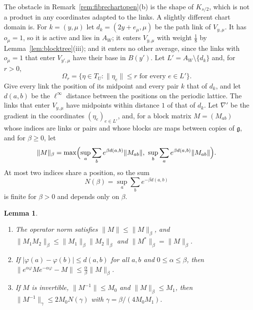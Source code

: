 \documentclass[11pt]{amsart}
\newtheorem{lemma}[theorem]{Lemma}
\theoremstyle{definition}
\theoremstyle{remark}
\numberwithin{equation}{section}
\newcommand{\g}{\mathfrak{g}}
\begin{document}
The obstacle in Remark~\ref{rem:fibrechartopen}(b) is the shape of
$K_{s/2}$, which is not a product in any coordinates adapted to the links. A
slightly different chart domain is. For $k=(y,\mu)$ let $d_k=(2y+e_\mu,\mu)$
be the path link of $V_{y,\mu}$. It has $o_\mu=1$, so it is active and lies
in $A_W$; it enters $V_{y,\mu}$ with weight $\frac18$ by
Lemma~\ref{lem:blocktree}(iii); and it enters no other average, since the
links with $o_\mu=1$ that enter $V_{y',\mu}$ have their base in $B(y')$. Let
$L'=A_W\setminus\{d_k\}$ and, for $r>0$,
\[
\Omega_r=\{\eta\in T_U:\lVert\eta_e\rVert\le r\text{ for every }e\in L'\}.
\]
Give every link the position of its midpoint and every pair $k$ that of
$d_k$, and let $d(a,b)$ be the $\ell^\infty$ distance between the positions
on the periodic lattice. The links that enter $V_{y,\mu}$ have midpoints
within distance $1$ of that of $d_k$. Let $\nabla'$ be the gradient in the
coordinates $(\eta_e)_{e\in L'}$, and, for a block matrix $M=(M_{ab})$
whose indices are links or pairs and whose blocks are maps between copies
of $\g$, and for $\beta\ge0$, let
\[
\lVert M\rVert_\beta=\max\Bigl(\sup_a\sum_be^{\beta d(a,b)}\lVert M_{ab}
\rVert,\ \sup_b\sum_ae^{\beta d(a,b)}\lVert M_{ab}\rVert\Bigr).
\]
At most two indices share a position, so the sum
\[
N(\beta)=\sup_a\sum_be^{-\beta d(a,b)}
\]
is finite for $\beta>0$ and depends only on $\beta$.

\begin{lemma}\label{lem:kernels}
\begin{enumerate}[label=\textup{(\roman*)},leftmargin=*]
\item The operator norm satisfies $\lVert M\rVert\le\lVert M\rVert_\beta$,
and $\lVert M_1M_2\rVert_\beta\le\lVert M_1\rVert_\beta\lVert M_2
\rVert_\beta$ and $\lVert M^*\rVert_\beta=\lVert M\rVert_\beta$.
\item If $|\varphi(a)-\varphi(b)|\le d(a,b)$ for all $a,b$ and $0\le\alpha
\le\beta$, then $\lVert e^{\alpha\varphi}Me^{-\alpha\varphi}-M\rVert\le
\frac\alpha\beta\lVert M\rVert_\beta$.
\item If $M$ is invertible, $\lVert M^{-1}\rVert\le M_0$ and $\lVert M\rVert
_\beta\le M_1$, then $\lVert M^{-1}\rVert_\gamma\le2M_0N(\gamma)$ with
$\gamma=\beta/(4M_0M_1)$.
\end{enumerate}
\end{lemma}
\end{document}

